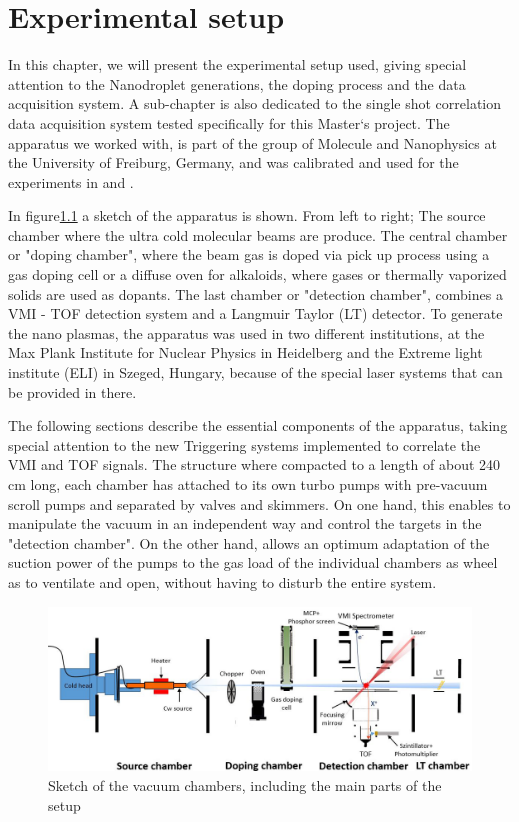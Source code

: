 
\chapter{Experimental setup}

In this chapter, we will present the experimental setup used, giving  special attention to  the Nanodroplet generations, the doping process and the data acquisition system. A  sub-chapter is also dedicated to the single shot correlation data acquisition system tested specifically for this Master`s project.
The apparatus we worked with, is part of the group of Molecule and Nanophysics at the University of Freiburg, Germany, and was calibrated and used for the experiments in \cite{schomas_compact_2017} and \cite{heidenreich_charging_2016}.

In figure\ref{img:setup} a sketch of the apparatus is shown. From left to right; The source chamber where the  ultra cold molecular beams are produce. The central chamber or "doping chamber", where the beam gas is doped via pick up process using a gas doping cell or a diffuse oven for alkaloids, where gases or thermally vaporized solids are used as dopants. The last  chamber or "detection chamber", combines a VMI - TOF detection system and a  Langmuir Taylor (LT) detector.
To generate the nano plasmas, the apparatus was used in two different institutions, at the Max Plank Institute for Nuclear Physics in Heidelberg and the Extreme light institute (ELI) in Szeged, Hungary, because of the special laser systems that can be provided in there.

The following sections describe the essential components of the apparatus, taking special attention to the new Triggering systems implemented to correlate the VMI and TOF signals.  The structure where compacted to a length of about 240 cm long, each chamber has attached to its own turbo pumps with  pre-vacuum scroll pumps and separated by valves and skimmers. On one hand, this enables to manipulate the vacuum in an independent way and control the targets in the "detection chamber". On the other hand, allows an optimum adaptation of the suction power of the pumps to the gas load of the individual chambers as wheel as to ventilate and open, without having to disturb the entire system.
\begin{figure}[hbtp] \label{img:setup}

\centering
\includegraphics[width=14 cm]{../Images/setup.png}
\caption{Sketch of the vacuum chambers, including the main parts of the setup}
\end{figure}


